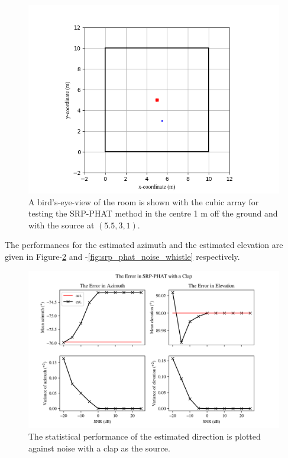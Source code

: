 \documentclass[notitlepage]{report}
\begin{document}
\begin{figure}[H]
\includegraphics[width=1\textwidth]{../Python/srp_phat/room_2d.png}
\centering
\caption{A bird's-eye-view of the room is shown with the cubic array for testing the SRP-PHAT method in the centre 1 \si{m} off the ground and with the source at $(5.5,3,1)$.}
\label{fig:srp_phat_room_2d}
\centering
\end{figure}

The performances for the estimated azimuth and the estimated elevation are given in Figure-\ref{fig:srp_phat_noise_clap} and -\ref{fig:srp_phat_noise_whistle} respectively.

\begin{figure}[H]
\includegraphics[width=1\textwidth]{../Python/srp_phat/noise/clap/plots.png}
\centering
\caption{The statistical performance of the estimated direction is plotted against noise with a clap as the source.}
\label{fig:srp_phat_noise_clap}
\centering
\end{figure}
\end{document}
